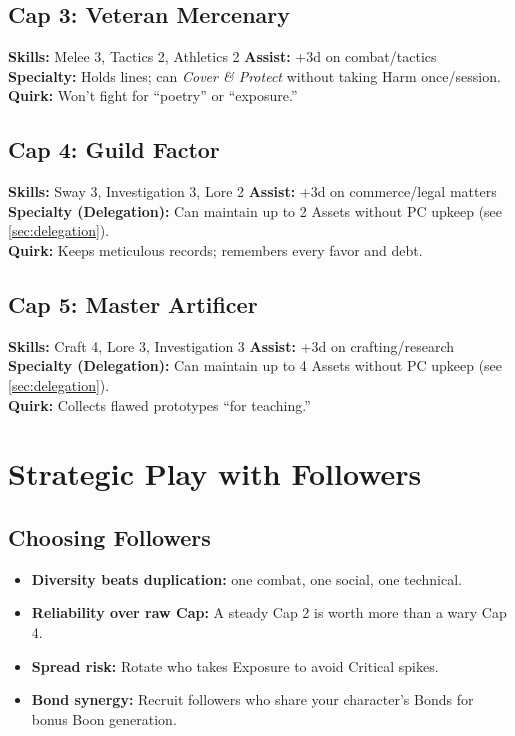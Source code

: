 \subsection*{Cap 3: Veteran Mercenary}
\textbf{Skills:} Melee 3, Tactics 2, Athletics 2 \quad
\textbf{Assist:} +3d on combat/tactics \\
\textbf{Specialty:} Holds lines; can \emph{Cover \& Protect} without taking Harm once/session. \\
\textbf{Quirk:} Won't fight for ``poetry'' or ``exposure.''

\subsection*{Cap 4: Guild Factor}
\textbf{Skills:} Sway 3, Investigation 3, Lore 2 \quad
\textbf{Assist:} +3d on commerce/legal matters \\
\textbf{Specialty (Delegation):} Can maintain up to 2 Assets without PC upkeep (see \ref{sec:delegation}). \\
\textbf{Quirk:} Keeps meticulous records; remembers every favor and debt.

\subsection*{Cap 5: Master Artificer}
\textbf{Skills:} Craft 4, Lore 3, Investigation 3 \quad
\textbf{Assist:} +3d on crafting/research \\
\textbf{Specialty (Delegation):} Can maintain up to 4 Assets without PC upkeep (see \ref{sec:delegation}). \\
\textbf{Quirk:} Collects flawed prototypes ``for teaching.''

\section{Strategic Play with Followers}

\subsection*{Choosing Followers}
\begin{itemize}
  \item \textbf{Diversity beats duplication:} one combat, one social, one technical.
  \item \textbf{Reliability over raw Cap:} A steady Cap 2 is worth more than a wary Cap 4.
  \item \textbf{Spread risk:} Rotate who takes Exposure to avoid Critical spikes.
  \item \textbf{Bond synergy:} Recruit followers who share your character's Bonds for bonus Boon generation.
\end{itemize}

